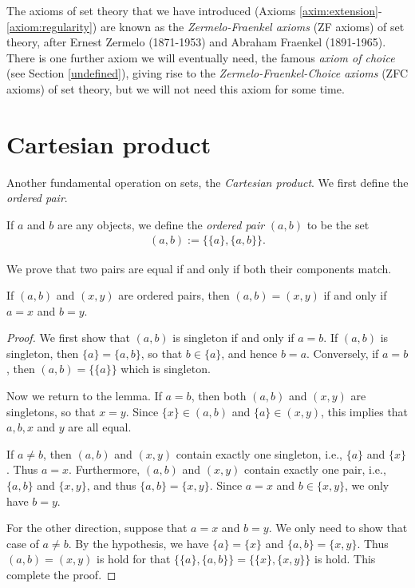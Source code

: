 \begin{remark}
    The axioms of set theory that we have introduced (Axioms \ref{axim:extension}-\ref{axiom:regularity}) are known as the \emph{Zermelo-Fraenkel axioms} (ZF axioms) of set theory, after Ernest Zermelo (1871-1953) and Abraham Fraenkel (1891-1965). There is one further axiom we will eventually need, the famous \emph{axiom of choice} (see Section \ref{undefined}), giving rise to the \emph{Zermelo-Fraenkel-Choice axioms} (ZFC axioms) of set theory, but we will not need this axiom for some time.
\end{remark}

\section{Cartesian product}

Another fundamental operation on sets, the \emph{Cartesian product}. We first define the \emph{ordered pair}.

\begin{definition}
    If $a$ and $b$ are any objects, we define the \emph{ordered pair} $(a, b)$ to be the set
    \begin{align*}
        (a, b) := \{\{a\}, \{a, b\}\}.
    \end{align*}
\end{definition}

We prove that two pairs are equal if and only if both their components match.

\begin{lemma}
    If $(a, b)$ and $(x, y)$ are ordered pairs, then $(a, b) = (x, y)$ if and only if $a = x$ and $b = y$.
\end{lemma}

\begin{proof}
    We first show that $(a, b)$ is singleton if and only if $a = b$. If $(a, b)$ is singleton, then $\{a\} = \{a, b\}$, so that $b \in \{a\}$, and hence $b = a$. Conversely, if $a = b$, then $(a, b) = \{\{a\}\}$ which is singleton.

    Now we return to the lemma. If $a = b$, then both $(a, b)$ and $(x, y)$ are singletons, so that $x = y$. Since $\{x\} \in (a, b)$ and $\{a\} \in (x, y)$, this implies that $a, b, x$ and $y$ are all equal.

    If $a \neq b$, then $(a, b)$ and $(x, y)$ contain exactly one singleton, i.e., $\{a\}$ and $\{x\}$. Thus $a = x$. Furthermore, $(a, b)$ and $(x, y)$ contain exactly one pair, i.e., $\{a, b\}$ and $\{x, y\}$, and thus $\{a, b\} = \{x, y\}$. Since $a = x$ and $b \in \{x, y\}$, we only have $b = y$.

    For the other direction, suppose that $a = x$ and $b = y$. We only need to show that case of $a \neq b$. By the hypothesis, we have $\{a\} = \{x\}$ and $\{a, b\} = \{x, y\}$. Thus $(a, b) = (x, y)$ is hold for that $\{\{a\}, \{a, b\}\} = \{\{x\}, \{x, y\}\}$ is hold. This complete the proof.
\end{proof}

